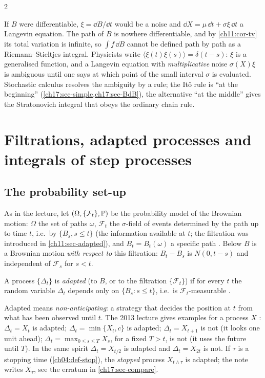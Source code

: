 \begin{paracol}{2}
\begin{intuition}
If $B$ were differentiable, $\xi=\dd B/\dd t$ would be a noise and $\dd X=\mu\,\dd t+\sigma\xi\,\dd t$ a Langevin equation. The path of $B$
is nowhere differentiable, and by \cref{ch11:cor-tv} its total variation is infinite, so $\int f\,\dd B$ cannot be defined path by
path as a Riemann--Stieltjes integral. Physicists write $\langle\xi(t)\xi(s)\rangle=\delta(t-s)$: $\xi$ is a generalised function, and a
Langevin equation with \emph{multiplicative} noise $\sigma(X)\xi$ is ambiguous until one says at which point of
the small interval $\sigma$ is evaluated. Stochastic calculus resolves the ambiguity by a rule; the It\^o rule is
``at the beginning'' (\cref{ch17:sec-simple,ch17:sec-BdB}), the alternative ``at the middle'' gives the Stratonovich integral
that obeys the ordinary chain rule.
\end{intuition}

\section{Filtrations, adapted processes and integrals of step processes}\label{ch17:sec-simple}

\subsection{The probability set-up}\label{ch17:sec-setup}
As in the lecture, let $(\Omega,\{\mathcal F_t\},\mathbb{P})$ be the probability model of the Brownian motion: $\Omega$ the set of
paths $\omega$, $\mathcal F_t$ the $\sigma$-field of events determined by the path up to time $t$, i.e.\ by $\{B_s,s\le t\}$
(the information available at $t$; the filtration was introduced in \cref{ch11:sec-adapted}), and $B_t=B_t(\omega)$ a
specific path . Below $B$ is a Brownian motion
\emph{with respect to} this filtration: $B_t-B_s$ is $N(0,t-s)$ and independent of $\mathcal F_s$ for $s<t$.

\begin{definition}\label{ch17:def-adapted}
A process $\{\Delta_t\}$ is \emph{adapted} (to $B$, or to the filtration $\{\mathcal F_t\}$) if for every $t$ the random variable $\Delta_t$
depends only on $\{B_s:s\le t\}$, i.e.\ is $\mathcal F_t$-measurable .
\end{definition}
Adapted means \emph{non-anticipating}: a strategy that decides the position at $t$ from what has been observed until $t$.
The 2013 lecture gives examples for a process $X$ : $\Delta_t=X_t$ is adapted;
$\Delta_t=\min\{X_t,c\}$ is adapted; $\Delta_t=X_{t+1}$ is not (it looks one unit ahead); $\Delta_t=\max_{0\le s\le T}X_s$, for a fixed
$T>t$, is not (it uses the future until $T$). In the same spirit $\Delta_t=X_{t/2}$ is adapted and $\Delta_t=X_{2t}$ is not. If $\tau$ is a stopping time (\cref{ch04:def-stop}),
the \emph{stopped} process $X_{t\wedge\tau}$ is adapted; the note writes $X_\tau$, see the erratum in \cref{ch17:sec-compare}.


\end{paracol}
